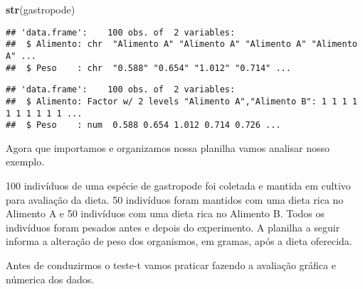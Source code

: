 \documentclass[titlepage, oneside, openany, a4paper]{book}
\newenvironment{Shaded}{\begin{snugshade}}{\end{snugshade}}
\newcommand{\DataTypeTok}[1]{\textcolor[rgb]{0.13,0.29,0.53}{#1}}
\newcommand{\KeywordTok}[1]{\textcolor[rgb]{0.13,0.29,0.53}{\textbf{#1}}}
\newcommand{\NormalTok}[1]{#1}
\newcommand{\OperatorTok}[1]{\textcolor[rgb]{0.81,0.36,0.00}{\textbf{#1}}}
\newcommand{\StringTok}[1]{\textcolor[rgb]{0.31,0.60,0.02}{#1}}
\begin{document}
\begin{Shaded}
\begin{Highlighting}[]
\KeywordTok{str}\NormalTok{(gastropode)}
\end{Highlighting}
\end{Shaded}

\begin{verbatim}
## 'data.frame':    100 obs. of  2 variables:
##  $ Alimento: chr  "Alimento A" "Alimento A" "Alimento A" "Alimento A" ...
##  $ Peso    : chr  "0.588" "0.654" "1.012" "0.714" ...
\end{verbatim}

\begin{Shaded}
\end{Shaded}

\begin{verbatim}
## 'data.frame':    100 obs. of  2 variables:
##  $ Alimento: Factor w/ 2 levels "Alimento A","Alimento B": 1 1 1 1 1 1 1 1 1 1 ...
##  $ Peso    : num  0.588 0.654 1.012 0.714 0.726 ...
\end{verbatim}

Agora que importamos e organizamos nossa planilha vamos analisar nosso exemplo.

100 indivíduos de uma espécie de gastropode foi coletada e mantida em cultivo para avaliação da dieta. 50 indivíduos foram mantidos com uma dieta rica no Alimento A e 50 indivíduos com uma dieta rica no Alimento B. Todos os indivíduos foram pesados antes e depois do experimento. A planilha a seguir informa a alteração de peso dos organismos, em gramas, após a dieta oferecida.

Antes de conduzirmos o teste-t vamos praticar fazendo a avaliação gráfica e númerica dos dados.

\begin{Shaded}
\end{Shaded}
\end{document}
